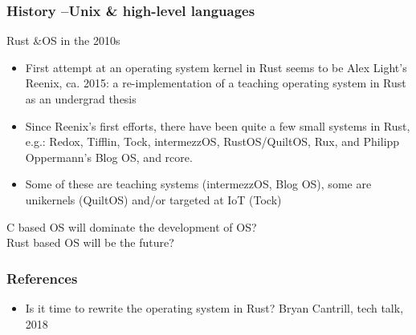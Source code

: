 \begin{frame}[plain]
	\frametitle{History --Unix \& high-level languages}
	
	Rust \&OS in the 2010s
	
	\begin{itemize}
		
		\item  First attempt at an operating system kernel in Rust seems to be
		Alex Light’s Reenix, ca. 2015: a re-implementation of a teaching
		operating system in Rust as an undergrad thesis
		
		
		\item  Since Reenix’s first efforts, there have been quite a few small
		systems in Rust, e.g.: Redox, Tifflin, Tock, intermezzOS,
		RustOS/QuiltOS, Rux, and Philipp Oppermann’s Blog OS, and rcore.
		
		\item Some of these are teaching systems (intermezzOS, Blog OS),
		some are unikernels (QuiltOS) and/or targeted at IoT (Tock)
		
		
	\end{itemize}
	\LARGE
	C based OS will dominate the development of OS?  \\
	Rust based OS will be the future?
\end{frame}

\begin{frame}[plain]
	\frametitle{References}

	\begin{itemize}
		
		\item Is it time to rewrite the operating system in Rust? Bryan Cantrill, tech talk, 2018
		
		
		
		
	\end{itemize}
	
	
\end{frame}
